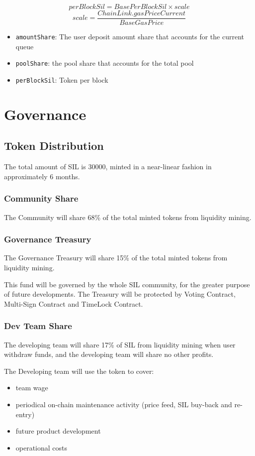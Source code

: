 \documentclass[11pt,letterpaper]{article}
\begin{document}
\begin{multicols}{2}
\[ perBlockSil =  BasePerBlockSil \times scale \]
\[ scale = \frac{ChainLink.gasPriceCurrent}{BaseGasPrice} \]
\begin{itemize}
    \item \texttt{amountShare}: The user deposit amount share that accounts for the current queue
    \item \texttt{poolShare}: the pool share that accounts for the total pool
    \item \texttt{perBlockSil}: Token per block
\end{itemize}

\section{Governance}
\subsection{Token Distribution}
The total amount of SIL is 30000, minted in a near-linear fashion in approximately 6 months.

\subsubsection{Community Share}
The Community will share 68\% of the total minted tokens from liquidity mining.

\subsubsection{Governance Treasury}
The Governance Treasury will share 15\% of the total minted tokens from liquidity mining.

This fund will be governed by the whole SIL community, for the greater purpose of future developments. The Treasury will be protected by Voting Contract, Multi-Sign Contract and TimeLock Contract.

\subsubsection{Dev Team Share}
The developing team will share 17\% of SIL from liquidity mining when user withdraw funds, and the developing team will share no other profits.

The Developing team will use the token to cover:
\begin{itemize}
    \item team wage
    \item periodical on-chain maintenance activity (price feed, SIL buy-back and re-entry)
    \item future product development
    \item operational costs
\end{itemize}


\end{multicols}
\end{document}

